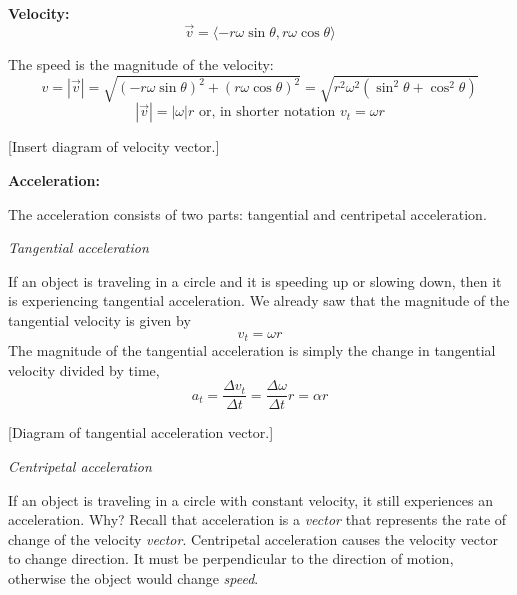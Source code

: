 \textbf{Velocity:}
$$\boxed{\vec{v}=\langle{-r\omega\sin\theta,r\omega\cos\theta}\rangle}$$

The speed is the magnitude of the velocity:
$$v=|\vec{v}|=\sqrt{(-r\omega\sin\theta)^2+(r\omega\cos\theta)^2}=\sqrt{r^2\omega^2(\sin^2\theta+\cos^2\theta)}$$
$$\boxed{|\vec{v}|=|\omega| r} \mbox{ or, in shorter notation } \boxed{v_t=\omega r}$$

[Insert diagram of velocity vector.]
\vspace{5cm}

\textbf{Acceleration:}

The acceleration consists of two parts: tangential and centripetal acceleration. %
\bigskip

\textit{Tangential acceleration}

If an object is traveling in a circle and it is speeding up or slowing down, then it is experiencing tangential acceleration. We already saw that the magnitude of the tangential velocity is given by
$$v_t = \omega r$$
The magnitude of the tangential acceleration is simply the change in tangential velocity divided by time,
$$a_t = \frac{\Delta v_t}{\Delta t} = \frac{\Delta \omega}{\Delta t}r = \alpha r$$

[Diagram of tangential acceleration vector.]
\vspace{3cm}


\textit{Centripetal acceleration}

If an object is traveling in a circle with constant velocity, it still experiences an acceleration. Why? Recall that acceleration is a \textit{vector} that represents the rate of change of the velocity \textit{vector}. Centripetal acceleration causes the velocity vector to change direction. It must be perpendicular to the direction of motion, otherwise the object would change \textit{speed}.

\vspace{5cm}

